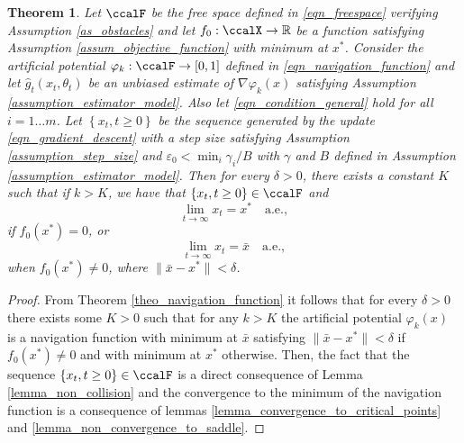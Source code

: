 \documentclass[article]{IEEEtran}
\newtheorem{theorem}{Theorem}
\theoremstyle{definition}
\begin{document}
%
%
\begin{theorem}\label{theo_unbiased}
Let $\ccalF$ be the free space defined in \eqref{eqn_freespace} verifying Assumption \ref{as_obstacles} and let $f_0:\ccalX \to \mathbb{R}$ be a function satisfying Assumption \ref{assum_objective_function} with minimum at $x^*$. Consider the artificial potential $\varphi_k:\ccalF\to[0,1]$ defined in \eqref{eqn_navigation_function} and let $\hat{g}_t(x_t,\theta_t)$ be an unbiased estimate of $\nabla \varphi_k(x)$ satisfying Assumption \ref{assumption_estimator_model}. Also let \eqref{eqn_condition_general} hold for all $i=1\ldots m$. Let $\left\{x_t, t\geq 0\right\}$ be the sequence generated by the update \eqref{eqn_gradient_descent} with a step size satisfying Assumption \ref{assumption_step_size} and $\varepsilon_0 <\min_i \gamma_i/B$ with $\gamma$ and $B$ defined in Assumption \ref{assumption_estimator_model}. Then for every $\delta>0$, there exists a constant $K$ such that if $k>K$, we have that  $\left\{x_t, t\geq0 \right\} \in \ccalF$ and 
%
\begin{equation}
\lim_{t\to \infty} x_t = x^* \quad \mbox{a.e.},
\end{equation}
%
if $f_0(x^*)=0$, or
%
\begin{equation}
\lim_{t\to \infty} x_t = \bar{x} \quad \mbox{a.e.},
\end{equation}
%
when $f_0(x^*)\neq0$, where $\|\bar{x}-x^*\|<\delta$. 
\end{theorem}
\begin{proof}
From Theorem \ref{theo_navigation_function} it follows that for every $\delta>0$ there exists some $K>0$ such that for any $k>K$ the artificial potential $\varphi_k(x)$ is a navigation function with minimum at $\bar{x}$ satisfying $\|\bar{x}-x^*\|<\delta$ if $f_0(x^*)\neq 0$ and with minimum at $x^*$ otherwise. Then, the fact that the sequence $\left\{x_t, t\geq0\right\}\in\ccalF$ is a direct consequence of Lemma \ref{lemma_non_collision} and the convergence to the minimum of the navigation function is a consequence of lemmas \ref{lemma_convergence_to_critical_points} and \ref{lemma_non_convergence_to_saddle}.
\end{proof}
%
\end{document}
